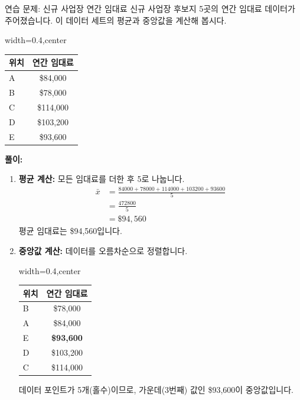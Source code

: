 \documentclass[11pt,a4paper]{article}
\begin{document}
\begin{examplebox}{연습 문제: 신규 사업장 연간 임대료}
신규 사업장 후보지 5곳의 연간 임대료 데이터가 주어졌습니다. 이 데이터 세트의 평균과 중앙값을 계산해 봅시다.

\begin{adjustbox}{width=0.4\textwidth,center}
\begin{tabular}{lc}
\toprule
\textbf{위치} & \textbf{연간 임대료} \\
\midrule
A & \$84,000 \\
B & \$78,000 \\
C & \$114,000 \\
D & \$103,200 \\
E & \$93,600 \\
\bottomrule
\end{tabular}
\end{adjustbox}
\label{tab:rental_data}

\textbf{풀이:}
\begin{enumerate}
    \item \textbf{평균 계산:} 모든 임대료를 더한 후 5로 나눕니다.
    \begin{align*}
        \bar{x} &= \frac{84000 + 78000 + 114000 + 103200 + 93600}{5} \\
        &= \frac{472800}{5} \\
        &= \$94,560
    \end{align*}
    평균 임대료는 \$94,560입니다.

    \item \textbf{중앙값 계산:} 데이터를 오름차순으로 정렬합니다.
    \begin{adjustbox}{width=0.4\textwidth,center}
    \begin{tabular}{lc}
    \toprule
    \textbf{위치} & \textbf{연간 임대료} \\
    \midrule
    B & \$78,000 \\
    A & \$84,000 \\
    E & \textbf{\$93,600} \\ %
    D & \$103,200 \\
    C & \$114,000 \\
    \bottomrule
    \end{tabular}
    \end{adjustbox}
    \label{tab:rental_data_sorted}
    데이터 포인트가 5개(홀수)이므로, 가운데(3번째) 값인 \$93,600이 중앙값입니다.
\end{enumerate}
\end{examplebox}
\end{document}
